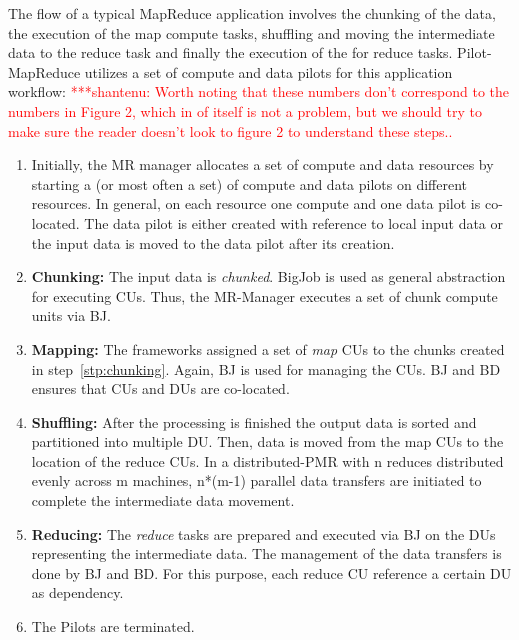 \documentclass{acm_proc_article-sp}
\newcommand{\jhanote}[1]{ {\textcolor{red} { ***shantenu: #1 }}}
\newcommand{\alnote}[1]{ {\textcolor{blue} { ***andreL: #1 }}}
\newcommand{\pnote}[1]{ {\textcolor{magenta} { ***pradeep: #1 }}}
\newcommand{\alnote}[1]{}
\newcommand{\pnote}[1]{}
\newcommand{\jhanote}[1]{}
\newcommand{\pilots}{Pilots\xspace}
\newcommand{\pilotmapreduce}{Pilot-MapReduce\xspace}
\begin{document}
The flow of a typical MapReduce application involves the chunking of
the data, the execution of the map compute tasks, shuffling and moving
the intermediate data to the reduce task and finally the execution of
the for reduce tasks.  \pilotmapreduce utilizes a set of compute and
data pilots for this application workflow: \jhanote{Worth noting that
  these numbers don't correspond to the numbers in Figure 2, which in
  of itself is not a problem, but we should try to make sure the
  reader doesn't look to figure 2 to understand these steps..}
\begin{enumerate}
	\item Initially, the MR manager allocates a set of compute and data 
	resources by starting a (or most often a set) of compute and data pilots 
	on different resources. In general, on each resource one compute 
	and one data pilot is co-located. The data pilot is either created with 
	reference to local input data or the input data is moved to the data pilot 
	after its creation. 

	\item \textbf{Chunking:} The input data is {\it chunked}. BigJob is used 
	as general abstraction for executing CUs. Thus, the MR-Manager executes a set of 
	chunk compute units via BJ. \label{stp:chunking}
	
	\item \textbf{Mapping:} The frameworks assigned a set of {\it map} CUs to 
	the chunks created in step~\ref{stp:chunking}. Again, BJ is used for managing the CUs. 
	BJ and BD ensures that CUs and DUs are co-located.
	
	\item \textbf{Shuffling:} %
		After the processing is finished the output data is sorted and partitioned into 
		multiple DU. Then, data is moved from the map CUs to the location of the reduce 
		CUs. In a distributed-PMR with n reduces distributed evenly across m machines, n*(m-1) 
		parallel data transfers are initiated to complete the intermediate data movement. 
	
	\item \textbf{Reducing:} The {\it reduce} tasks are prepared and 
	executed via BJ on the DUs representing the intermediate data. The 
	management of the data transfers is done by BJ and BD. For this purpose, 
	each reduce CU reference a certain DU as dependency.
	
	\item The \pilots are terminated.

\end{enumerate}
\end{document}
